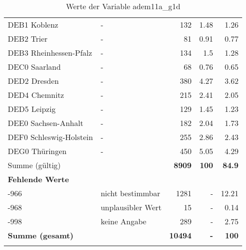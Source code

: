 \begin{longtable}{Xlrrr}
        \multicolumn{1}{X}{DEB1 Koblenz} & - & \num{132} & \num[round-mode=places,round-precision=2]{1.48} & \num[round-mode=places,round-precision=2]{1.26} \\
        \multicolumn{1}{X}{DEB2 Trier} & - & \num{81} & \num[round-mode=places,round-precision=2]{0.91} & \num[round-mode=places,round-precision=2]{0.77} \\
        \multicolumn{1}{X}{DEB3 Rheinhessen-Pfalz} & - & \num{134} & \num[round-mode=places,round-precision=2]{1.5} & \num[round-mode=places,round-precision=2]{1.28} \\
        \multicolumn{1}{X}{DEC0 Saarland} & - & \num{68} & \num[round-mode=places,round-precision=2]{0.76} & \num[round-mode=places,round-precision=2]{0.65} \\
        \multicolumn{1}{X}{DED2 Dresden} & - & \num{380} & \num[round-mode=places,round-precision=2]{4.27} & \num[round-mode=places,round-precision=2]{3.62} \\
        \multicolumn{1}{X}{DED4 Chemnitz} & - & \num{215} & \num[round-mode=places,round-precision=2]{2.41} & \num[round-mode=places,round-precision=2]{2.05} \\
        \multicolumn{1}{X}{DED5 Leipzig} & - & \num{129} & \num[round-mode=places,round-precision=2]{1.45} & \num[round-mode=places,round-precision=2]{1.23} \\
        \multicolumn{1}{X}{DEE0 Sachsen-Anhalt} & - & \num{182} & \num[round-mode=places,round-precision=2]{2.04} & \num[round-mode=places,round-precision=2]{1.73} \\
        \multicolumn{1}{X}{DEF0 Schleswig-Holstein} & - & \num{255} & \num[round-mode=places,round-precision=2]{2.86} & \num[round-mode=places,round-precision=2]{2.43} \\
        \multicolumn{1}{X}{DEG0 Thüringen} & - & \num{450} & \num[round-mode=places,round-precision=2]{5.05} & \num[round-mode=places,round-precision=2]{4.29} \\
     \midrule
      \multicolumn{2}{l}{Summe (gültig)} & \textbf{\num{8909}} &
      \textbf{\num{100}} &
         \textbf{\num[round-mode=places,round-precision=2]{84.9}} \\
     \multicolumn{5}{l}{\textbf{Fehlende Werte}}\\
       -966 & nicht bestimmbar & \num{1281} & - & \num[round-mode=places,round-precision=2]{12.21} \\

       -968 & unplausibler Wert & \num{15} & - & \num[round-mode=places,round-precision=2]{0.14} \\

       -998 & keine Angabe & \num{289} & - & \num[round-mode=places,round-precision=2]{2.75} \\

     \midrule
     \multicolumn{2}{l}{\textbf{Summe (gesamt)}} & \textbf{\num{10494}} & \textbf{-} & \textbf{\num{100}} \\
     \bottomrule
     \caption{Werte der Variable adem11a\_g1d}
     \end{longtable}
     
